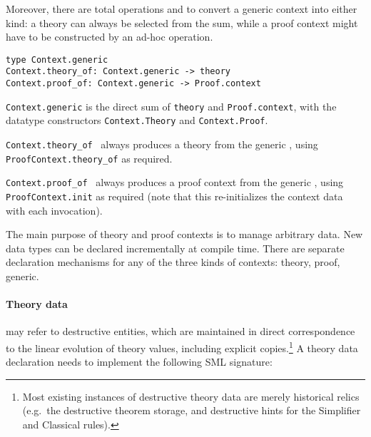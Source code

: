 \begin{isabellebody}
\begin{isamarkuptext}
  Moreover, there are total operations  and  to convert a generic context into either kind: a theory
  can always be selected from the sum, while a proof context might
  have to be constructed by an ad-hoc  operation.%
\end{isamarkuptext}%
\isamarkuptrue%
%
\isadelimmlref
%
\endisadelimmlref
%
\isatagmlref
%
\begin{isamarkuptext}%
\begin{mldecls}
  \verb|type Context.generic| \\
  \verb|Context.theory_of: Context.generic -> theory| \\
  \verb|Context.proof_of: Context.generic -> Proof.context| \\
  \end{mldecls}

  \begin{description}

  \item \verb|Context.generic| is the direct sum of \verb|theory| and \verb|Proof.context|, with the datatype
  constructors \verb|Context.Theory| and \verb|Context.Proof|.

  \item \verb|Context.theory_of|~ always produces a
  theory from the generic , using \verb|ProofContext.theory_of| as required.

  \item \verb|Context.proof_of|~ always produces a
  proof context from the generic , using \verb|ProofContext.init| as required (note that this re-initializes the
  context data with each invocation).

  \end{description}%
\end{isamarkuptext}%
\isamarkuptrue%
%
\endisatagmlref
{\isafoldmlref}%
%
\isadelimmlref
%
\endisadelimmlref
%
\isamarkuptrue%
%
\begin{isamarkuptext}%
The main purpose of theory and proof contexts is to manage arbitrary
  data.  New data types can be declared incrementally at compile time.
  There are separate declaration mechanisms for any of the three kinds
  of contexts: theory, proof, generic.

  \paragraph{Theory data} may refer to destructive entities, which are
  maintained in direct correspondence to the linear evolution of
  theory values, including explicit copies.\footnote{Most existing
  instances of destructive theory data are merely historical relics
  (e.g.\ the destructive theorem storage, and destructive hints for
  the Simplifier and Classical rules).}  A theory data declaration
  needs to implement the following SML signature:


\end{isamarkuptext}
\end{isabellebody}
